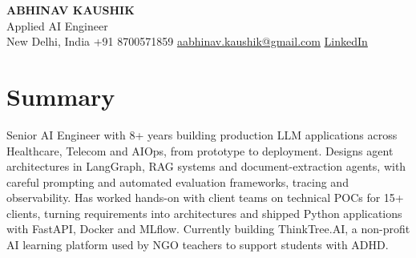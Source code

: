 \documentclass[10pt,a4paper]{article}
\begin{document}
\begin{center}
  {\LARGE\bfseries ABHINAV KAUSHIK}\\[2pt]
  {\large Applied AI Engineer}\\[2pt]
  New Delhi, India \textbar{} +91 8700571859 \textbar{} \href{mailto:aabhinav.kaushik@gmail.com}{aabhinav.kaushik@gmail.com} \textbar{} \href{https://www.linkedin.com/in/abhinav-kaushik10/}{LinkedIn}  
\end{center}

\section{Summary}
Senior AI Engineer with 8+ years building production LLM applications across Healthcare, Telecom and AIOps, from prototype to deployment. Designs agent architectures in LangGraph, RAG systems and document-extraction agents, with careful prompting and automated evaluation frameworks, tracing and observability. Has worked hands-on with client teams on technical POCs for 15+ clients, turning requirements into architectures and shipped Python applications with FastAPI, Docker and MLflow. Currently building ThinkTree.AI, a non-profit AI learning platform used by NGO teachers to support students with ADHD.
\end{document}
